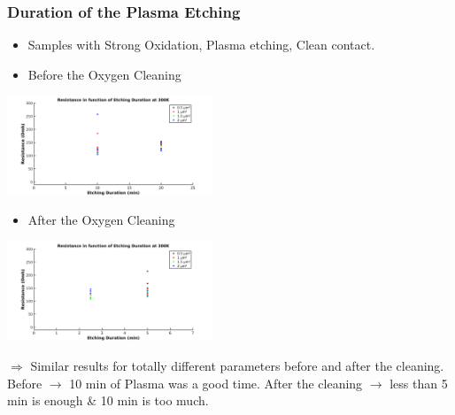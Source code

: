 \documentclass[handout]{beamer}
\begin{document}
     \begin{frame}
        \frametitle{Duration of the Plasma Etching}
        \begin{itemize}
            \item Samples with Strong Oxidation, Plasma etching, Clean contact.
            \end{itemize}
        \begin{multicols}{2}
        \begin{itemize}
            \item Before the Oxygen Cleaning 
            \end{itemize}
            \includegraphics[width=174pt]{R_TimeBefore.png}
            
            
            \begin{itemize}
            \item After the Oxygen Cleaning
            \end{itemize}
            \includegraphics[width=174pt]{R_TimeAfter.png}
            
        \end{multicols}
                
        $\Longrightarrow$ Similar results for totally different parameters before and after the cleaning. Before $\longrightarrow$ 10 min of Plasma was a good time. After the cleaning $\longrightarrow$ less than 5 min is enough \& 10 min is too much.
        
        \end{frame}
        
\end{document}
